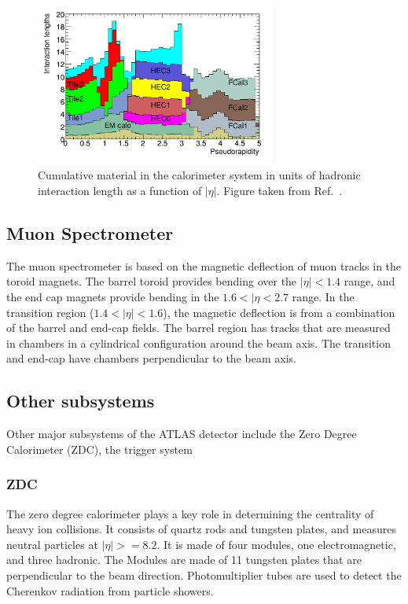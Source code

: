 \begin{figure}[ht]
	\centering
        \includegraphics[width=0.7\textwidth]{figures/setup/interaction_lengths}
          \caption{Cumulative material in the calorimeter system in units of hadronic interaction length as a function of $|\eta|$.
          Figure taken from Ref.~\cite{Aad:2008zzm}.}
          \label{fig:interaction_lenghts}
\end{figure}

\subsection{Muon Spectrometer}
The muon spectrometer is based on the magnetic deflection of muon tracks in the toroid magnets.
The barrel toroid provides bending over the $|\eta| < 1.4$ range, and the end cap magnets provide bending in the $1.6 < |\eta < 2.7$ range.
In the transition region ($1.4 < |\eta| < 1.6$), the magnetic deflection is from a combination of the barrel and end-cap fields.
The barrel region has tracks that are measured in chambers in a cylindrical configuration around the beam axis.
The transition and end-cap have chambers perpendicular to the beam axis.



\subsection{Other subsystems}
Other major subsystems of the ATLAS detector include the Zero Degree Calorimeter (ZDC), the trigger system

\subsubsection{ZDC}
The zero degree calorimeter plays a key role in determining the centrality of heavy ion collisions.
It consists of quartz rods and tungsten plates, and measures neutral particles at $|\eta| >= 8.2$.
It is made of four modules, one electromagnetic, and three hadronic.
The Modules are made of 11 tungsten plates that are perpendicular to the beam direction.
Photomultiplier tubes are used to detect the Cherenkov radiation from particle showers.


